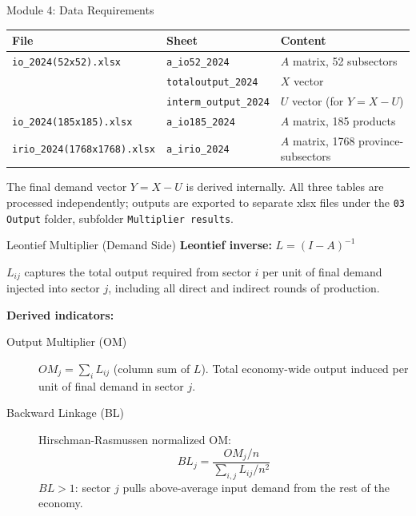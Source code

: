 \documentclass[aspectratio=169]{beamer}
\begin{document}
\begin{frame}{Module 4: Data Requirements}
\begin{center}
\renewcommand{\arraystretch}{1.2}
\footnotesize
\begin{tabular}{@{}p{4.2cm}p{3.0cm}p{4.2cm}@{}}
\toprule
\textbf{File} & \textbf{Sheet} & \textbf{Content} \\
\midrule
\texttt{io\_2024(52x52).xlsx} & \texttt{a\_io52\_2024} & $A$ matrix, 52 subsectors \\
 & \texttt{totaloutput\_2024} & $X$ vector \\
 & \texttt{interm\_output\_2024} & $U$ vector (for $Y = X - U$) \\
\texttt{io\_2024(185x185).xlsx} & \texttt{a\_io185\_2024} & $A$ matrix, 185 products \\
\texttt{irio\_2024(1768x1768).xlsx} & \texttt{a\_irio\_2024} & $A$ matrix, 1768 province-subsectors \\
\bottomrule
\end{tabular}
\end{center}

\medskip
\small
The final demand vector $Y = X - U$ is derived internally. All three tables are processed independently; outputs are exported to separate xlsx files under the \texttt{03 Output} folder, subfolder \texttt{Multiplier results}.
\end{frame}

\begin{frame}{Leontief Multiplier (Demand Side)}
\textbf{Leontief inverse:} $L = (I - A)^{-1}$

$L_{ij}$ captures the total output required from sector $i$ per unit of final demand injected into sector $j$, including all direct and indirect rounds of production.

\medskip
\textbf{Derived indicators:}
\begin{description}
  \item[Output Multiplier (OM)] $OM_j = \sum_i L_{ij}$ (column sum of $L$). Total economy-wide output induced per unit of final demand in sector $j$.
  \item[Backward Linkage (BL)] Hirschman-Rasmussen normalized OM:
  \[
  BL_j = \frac{OM_j / n}{\sum_{i,j} L_{ij} / n^2}
  \]
  $BL > 1$: sector $j$ pulls above-average input demand from the rest of the economy.
\end{description}
\end{frame}
\end{document}
